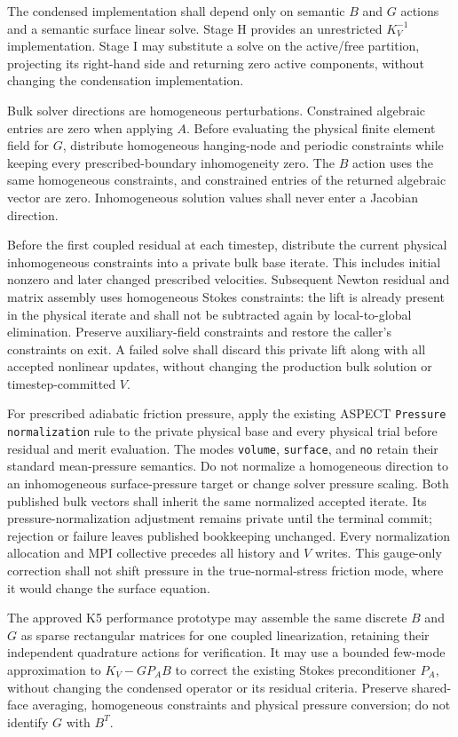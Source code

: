 \documentclass[11pt]{article}
\begin{document}
The condensed implementation shall depend only on semantic $B$ and $G$ actions
and a semantic surface linear solve.  Stage H provides an unrestricted
$K_V^{-1}$ implementation.  Stage I may substitute a solve on the active/free
partition, projecting its right-hand side and returning zero active
components, without changing the condensation implementation.

Bulk solver directions are homogeneous perturbations.  Constrained algebraic
entries are zero when applying $A$.  Before evaluating the physical finite
element field for $G$, distribute homogeneous hanging-node and periodic
constraints while keeping every prescribed-boundary inhomogeneity zero.  The
$B$ action uses the same homogeneous constraints, and constrained entries of
the returned algebraic vector are zero.  Inhomogeneous solution values shall
never enter a Jacobian direction.

Before the first coupled residual at each timestep, distribute the current
physical inhomogeneous constraints into a private bulk base iterate. This
includes initial nonzero and later changed prescribed velocities. Subsequent
Newton residual and matrix assembly uses homogeneous Stokes constraints: the
lift is already present in the physical iterate and shall not be subtracted
again by local-to-global elimination. Preserve auxiliary-field constraints and
restore the caller's constraints on exit. A failed solve shall discard this
private lift along with all accepted nonlinear updates, without changing the
production bulk solution or timestep-committed $V$.

For prescribed adiabatic friction pressure, apply the existing ASPECT
\texttt{Pressure normalization} rule to the private physical base and every
physical trial before residual and merit evaluation. The modes
\texttt{volume}, \texttt{surface}, and \texttt{no} retain their standard
mean-pressure semantics. Do not normalize a homogeneous direction to an
inhomogeneous surface-pressure target or change solver pressure scaling.
Both published bulk vectors shall inherit the same normalized accepted
iterate. Its pressure-normalization adjustment remains private until the
terminal commit; rejection or failure leaves published bookkeeping unchanged.
Every normalization allocation and MPI collective precedes all history and
$V$ writes. This gauge-only correction shall not shift pressure in the
true-normal-stress friction mode, where it would change the surface equation.

The approved K5 performance prototype may assemble the same discrete $B$ and
$G$ as sparse rectangular matrices for one coupled linearization, retaining
their independent quadrature actions for verification. It may use a bounded
few-mode approximation to $K_V-GP_A B$ to correct the existing Stokes
preconditioner $P_A$, without changing the condensed operator or its residual
criteria. Preserve shared-face averaging, homogeneous constraints and physical
pressure conversion; do not identify $G$ with $B^T$.
\end{document}
